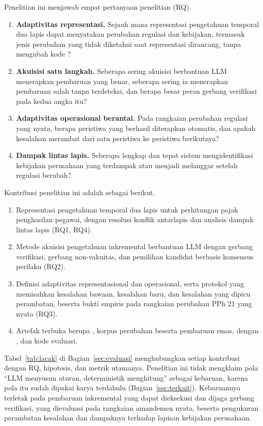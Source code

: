 Penelitian ini menjawab empat pertanyaan penelitian (RQ).
\begin{enumerate}[label=\textbf{RQ\arabic*},leftmargin=*,nosep]
  \item \textbf{Adaptivitas representasi.} Sejauh mana representasi pengetahuan temporal dua lapis dapat menyatakan perubahan regulasi dan kebijakan, termasuk jenis perubahan yang tidak diketahui saat representasi dirancang, tanpa mengubah kode ?
  \item \textbf{Akuisisi satu langkah.} Seberapa sering akuisisi berbantuan LLM menerapkan pembaruan yang benar, seberapa sering ia menerapkan pembaruan salah tanpa terdeteksi, dan berapa besar peran gerbang verifikasi pada kedua angka itu?
  \item \textbf{Adaptivitas operasional berantai.} Pada rangkaian perubahan regulasi yang nyata, berapa peristiwa yang berhasil diterapkan otomatis, dan apakah kesalahan merambat dari satu peristiwa ke peristiwa berikutnya?
  \item \textbf{Dampak lintas lapis.} Seberapa lengkap dan tepat sistem mengidentifikasi kebijakan perusahaan yang terdampak atau menjadi melanggar setelah regulasi berubah?
\end{enumerate}

Kontribusi penelitian ini adalah sebagai berikut.
\begin{enumerate}[label=\textbf{K\arabic*},leftmargin=*,nosep]
  \item Representasi pengetahuan temporal dua lapis untuk perhitungan pajak penghasilan pegawai, dengan resolusi konflik antarlapis dan analisis dampak lintas lapis (RQ1, RQ4).
  \item Metode akuisisi pengetahuan inkremental berbantuan LLM dengan gerbang verifikasi, gerbang non-vakuitas, dan pemilihan kandidat berbasis konsensus perilaku (RQ2).
  \item Definisi adaptivitas representasional dan operasional, serta protokol  yang memisahkan kesalahan bawaan, kesalahan baru, dan kesalahan yang dipicu perambatan, beserta bukti empiris pada rangkaian perubahan PPh 21 yang nyata (RQ3).
  \item Artefak terbuka berupa , korpus perubahan beserta pembaruan emas,  dengan , dan kode evaluasi.
\end{enumerate}
Tabel~\ref{tab:lacak} di Bagian~\ref{sec:evaluasi} menghubungkan setiap kontribusi dengan RQ, hipotesis, dan metrik utamanya. Penelitian ini tidak mengklaim pola ``LLM menyusun aturan,  deterministik menghitung'' sebagai kebaruan, karena pola itu sudah dipakai karya terdahulu (Bagian~\ref{sec:terkait}). Kebaruannya terletak pada pembaruan inkremental  yang dapat dieksekusi dan dijaga gerbang verifikasi, yang dievaluasi pada rangkaian amandemen nyata, beserta pengukuran perambatan kesalahan dan dampaknya terhadap lapisan kebijakan perusahaan.

